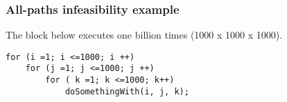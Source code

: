 \begin{frame}[fragile,hasprev=false,hasnext=false]
\label{example:all-paths}
\frametitle{All-paths infeasibility example}

The block below executes  one billion times
(1000 x 1000 x 1000).

\begin{lstlisting}
for (i =1; i <=1000; i ++)
	for (j =1; j <=1000; j ++)
		for ( k =1; k <=1000; k++)
			doSomethingWith(i, j, k);
\end{lstlisting}

\end{frame}


